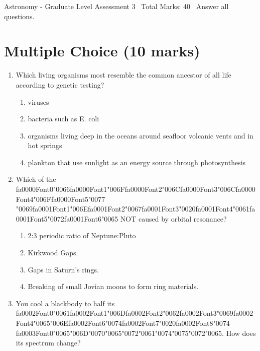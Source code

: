 \documentclass[12pt]{article}
\begin{document}
\begin{center}
Astronomy - Graduate Level Assessment 3 \
Total Marks: 40 \
Answer all questions.
\end{center}

\section*{Multiple Choice (10 marks)}
\begin{enumerate}[label=\arabic*.]
\item Which living organisms most resemble the common ancestor of all life according to genetic
testing?
\begin{enumerate}[label=(\alph*)]
    \item viruses
    \item bacteria such as E. coli
    \item organisms living deep in the oceans around seafloor volcanic vents and in hot springs
    \item plankton that use sunlight as an energy source through photosynthesis
\end{enumerate}
\item Which of the {\csname fa0000Font0\endcsname\char"0066}{\csname fa0000Font1\endcsname\char"006F}{\csname fa0000Font2\endcsname\char"006C}{\csname fa0000Font3\endcsname\char"006C}{\csname fa0000Font4\endcsname\char"006F}{\csname fa0000Font5\endcsname\char"0077} {\char"0069}{\csname fa0001Font1\endcsname\char"006E}{\csname fa0001Font2\endcsname\char"0067}{\csname fa0001Font3\endcsname\char"0020}{\csname fa0001Font4\endcsname\char"0061}{\csname fa0001Font5\endcsname\char"0072}{\csname fa0001Font6\endcsname\char"0065} NOT caused by orbital resonance?
\begin{enumerate}[label=(\alph*)]
    \item 2:3 periodic ratio of Neptune:Pluto
    \item Kirkwood Gaps.
    \item Gaps in Saturn's rings.
    \item Breaking of small Jovian moons to form ring materials.
\end{enumerate}
\item You cool a blackbody to half its {\csname fa0002Font0\endcsname\char"0061}{\csname fa0002Font1\endcsname\char"006D}{\csname fa0002Font2\endcsname\char"0062}{\csname fa0002Font3\endcsname\char"0069}{\csname fa0002Font4\endcsname\char"0065}{\char"006E}{\csname fa0002Font6\endcsname\char"0074}{\csname fa0002Font7\endcsname\char"0020}{\csname fa0002Font8\endcsname\char"0074} {\csname fa0003Font0\endcsname\char"0065}{\char"006D}{\char"0070}{\char"0065}{\char"0072}{\char"0061}{\char"0074}{\char"0075}{\char"0072}{\char"0065}. How does its spectrum change?

\end{enumerate}
\end{document}

